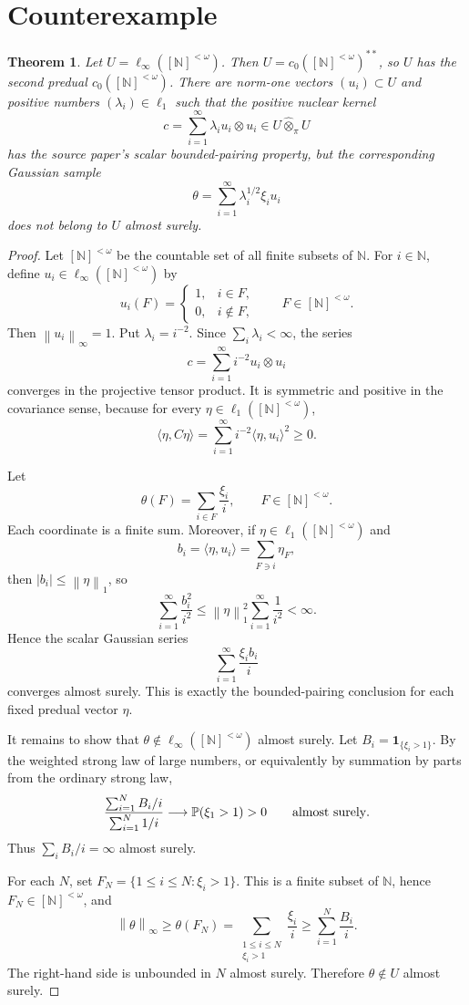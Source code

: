\documentclass[11pt]{article}
\newtheorem{theorem}{Theorem}
\newcommand{\N}{\mathbb N}
\newcommand{\Prob}{\mathbb P}
\newcommand{\co}{c_0}
\newcommand{\Gammafin}{[\N]^{<\omega}}
\newcommand{\norm}[1]{\left\lVert #1\right\rVert}
\begin{document}
\section*{Counterexample}

\begin{theorem}
Let \(U=\ell_\infty(\Gammafin)\).  Then \(U=\co(\Gammafin)^{**}\), so \(U\)
has the second predual \(\co(\Gammafin)\).  There are norm-one vectors
\((u_i)\subset U\) and positive numbers \((\lambda_i)\in\ell_1\) such that
the positive nuclear kernel
\[
  c=\sum_{i=1}^\infty \lambda_i u_i\otimes u_i
      \in U\widehat{\otimes}_\pi U
\]
has the source paper's scalar bounded-pairing property, but the corresponding
Gaussian sample
\[
  \theta=\sum_{i=1}^\infty \lambda_i^{1/2}\xi_i u_i
\]
does not belong to \(U\) almost surely.
\end{theorem}

\begin{proof}
Let \(\Gammafin\) be the countable set of all finite subsets of \(\mathbb N\).
For \(i\in\mathbb N\), define \(u_i\in \ell_\infty(\Gammafin)\) by
\[
  u_i(F)=
  \begin{cases}
  1, & i\in F,\\
  0, & i\notin F,
  \end{cases}
  \qquad F\in\Gammafin.
\]
Then \(\norm{u_i}_\infty=1\).  Put \(\lambda_i=i^{-2}\).  Since
\(\sum_i\lambda_i<\infty\), the series
\[
  c=\sum_{i=1}^\infty i^{-2}u_i\otimes u_i
\]
converges in the projective tensor product.  It is symmetric and positive in
the covariance sense, because for every \(\eta\in\ell_1(\Gammafin)\),
\[
  \langle \eta,C\eta\rangle
  =\sum_{i=1}^\infty i^{-2}\langle \eta,u_i\rangle^2\ge 0.
\]

Let
\[
  \theta(F)=\sum_{i\in F}\frac{\xi_i}{i}, \qquad F\in\Gammafin.
\]
Each coordinate is a finite sum.  Moreover, if \(\eta\in\ell_1(\Gammafin)\)
and
\[
  b_i=\langle \eta,u_i\rangle=\sum_{F\ni i}\eta_F,
\]
then \(|b_i|\le \norm{\eta}_1\), so
\[
  \sum_{i=1}^\infty \frac{b_i^2}{i^2}
  \le \norm{\eta}_1^2\sum_{i=1}^\infty \frac{1}{i^2}<\infty.
\]
Hence the scalar Gaussian series
\[
  \sum_{i=1}^\infty \frac{\xi_i b_i}{i}
\]
converges almost surely.  This is exactly the bounded-pairing conclusion for
each fixed predual vector \(\eta\).

It remains to show that \(\theta\notin\ell_\infty(\Gammafin)\) almost surely.
Let \(B_i=\mathbf 1_{\{\xi_i>1\}}\).  By the weighted strong law of large
numbers, or equivalently by summation by parts from the ordinary strong law,
\[
  \frac{\sum_{i=1}^N B_i/i}{\sum_{i=1}^N 1/i}
  \longrightarrow \Prob(\xi_1>1)>0
  \qquad\hbox{almost surely}.
\]
Thus \(\sum_i B_i/i=\infty\) almost surely.

For each \(N\), set \(F_N=\{1\le i\le N:\xi_i>1\}\).  This is a finite subset
of \(\mathbb N\), hence \(F_N\in\Gammafin\), and
\[
  \norm{\theta}_\infty
  \ge \theta(F_N)
  =\sum_{\substack{1\le i\le N\\ \xi_i>1}}\frac{\xi_i}{i}
  \ge \sum_{i=1}^N \frac{B_i}{i}.
\]
The right-hand side is unbounded in \(N\) almost surely.  Therefore
\(\theta\notin U\) almost surely.
\end{proof}
\end{document}
